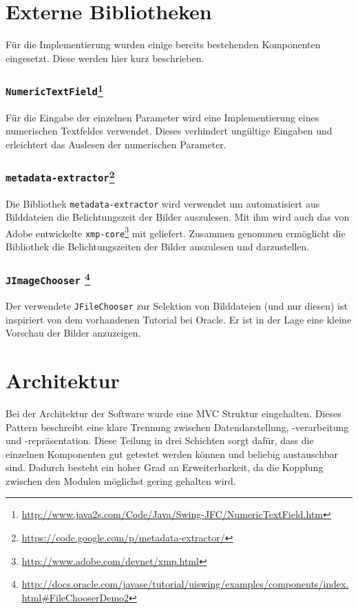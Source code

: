 \section{Externe Bibliotheken}
Für die Implementierung wurden einige bereits bestehenden Komponenten eingesetzt. Diese werden hier kurz beschrieben.

\subsubsection*{\texttt{NumericTextField}\footnote{\url{http://www.java2s.com/Code/Java/Swing-JFC/NumericTextField.htm}}}
Für die Eingabe der einzelnen Parameter wird eine Implementierung eines numerischen Textfeldes verwendet. Dieses verhindert ungültige Eingaben und erleichtert das Auslesen der numerischen Parameter.

\subsubsection*{\texttt{metadata-extractor}\footnote{\url{https://code.google.com/p/metadata-extractor/}}}
Die Bibliothek \texttt{metadata-extractor} wird verwendet um automatisiert aus Bilddateien die Belichtungszeit der Bilder auszulesen. Mit ihm wird auch das von Adobe entwickelte \texttt{xmp-core}\footnote{\url{http://www.adobe.com/devnet/xmp.html}} mit geliefert. Zusammen genommen ermöglicht die Bibliothek die Belichtungszeiten der Bilder auszulesen und darzustellen.

\subsubsection*{\texttt{JImageChooser} \footnote{\url{http://docs.oracle.com/javase/tutorial/uiswing/examples/components/index.html\#FileChooserDemo2}}} 
Der verwendete \texttt{JFileChooser} zur Selektion von Bilddateien (und nur diesen) ist inspiriert von dem vorhandenen Tutorial bei Oracle. Er ist in der Lage eine kleine Vorschau der Bilder anzuzeigen.


\section{Architektur}
\label{sec:architektur}
Bei der Architektur der Software wurde eine \gls{MVC} Struktur eingehalten. Dieses Pattern beschreibt eine klare Trennung zwischen Datendarstellung, -verarbeitung und -repräsentation. Diese Teilung in drei Schichten sorgt dafür, dass die einzelnen Komponenten gut getestet werden können und beliebig austauschbar sind. Dadurch besteht ein hoher Grad an Erweiterbarkeit, da die Kopplung zwischen den Modulen möglichst gering gehalten wird.



